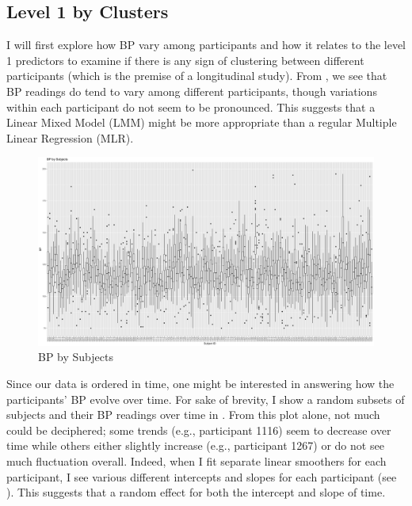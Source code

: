 \documentclass[12pt,twoside,letterpaper]{article}
\theoremstyle{definition}
\theoremstyle{definition}
\begin{document}
\subsection{Level 1 by Clusters}\label{sec: lv1}

I will first explore how BP vary among participants and how it relates to the level 1 predictors to examine if there is any sign of clustering between different participants (which is the premise of a longitudinal study). From , we see that BP readings do tend to vary among different participants, though variations within each participant do not seem to be pronounced. This suggests that a Linear Mixed Model (LMM) might be more appropriate than a regular Multiple Linear Regression (MLR).

\begin{figure} 
    \centering
    \includegraphics[width=\textwidth]{pics/bp by subjects.png}
    \caption{BP by Subjects}
    \label{fig: bp by subjects}
    \end{figure}

Since our data is ordered in time, one might be interested in answering how the participants' BP evolve over time. For sake of brevity, I show a random subsets of subjects and their BP readings over time in . From this plot alone, not much could be deciphered; some trends (e.g., participant 1116) seem to decrease over time while others either slightly increase (e.g., participant 1267) or do not see much fluctuation overall. Indeed, when I fit separate linear smoothers for each participant, I see various different intercepts and slopes for each participant (see ). This suggests that a random effect for both the intercept and slope of time.
\end{document}
